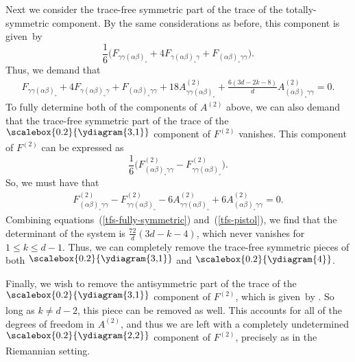 Next we consider the trace-free symmetric part of the trace of the totally-symmetric component. By the same considerations as before, this component is given~by
\[\frac{1}{6}\bigl(F_{\gamma \gamma (\alpha \beta)_\circ} + 4 F_{\gamma (\alpha \beta)_\circ \gamma} + F_{(\alpha \beta)_\circ \gamma \gamma}\bigr) .\]
Thus, we demand that
\begin{align} \label{tfs-fully-symmetric}
F_{\gamma \gamma (\alpha \beta)_\circ} + 4 F_{\gamma (\alpha \beta)_\circ \gamma} + F_{(\alpha \beta)_\circ \gamma \gamma} + 18 A^{(2)}_{\gamma \gamma (\alpha \beta)_\circ} + \frac{6(3d-2k-8)}{d} A^{(2)}_{(\alpha \beta)_\circ \gamma \gamma} = 0 .
\end{align}
To fully determine both of the components of $A^{(2)}$ above, we can also demand that the trace-free symmetric part of the trace of the $\raisebox{2.5pt}{\scalebox{0.2}{\ydiagram{3,1}}}$ component of $F^{(2)}$ vanishes. This component of $F^{(2)}$ can be expressed as
\[\frac{1}{6}\bigr(F^{(2)}_{(\alpha \beta)_\circ \gamma \gamma} - F^{(2)}_{\gamma \gamma (\alpha \beta)_\circ}\bigl) .\]
So, we must have that
\begin{align} \label{tfs-pistol}
F^{(2)}_{(\alpha \beta)_\circ \gamma \gamma} - F^{(2)}_{\gamma \gamma (\alpha \beta)_\circ} - 6 A^{(2)}_{\gamma \gamma (\alpha \beta)_\circ} + 6 A^{(2)}_{(\alpha \beta)_\circ \gamma \gamma} =0 .
\end{align}
Combining equations~(\ref{tfs-fully-symmetric}) and~(\ref{tfs-pistol}), we find that the determinant of the system is $\frac{72}{d} (3d-k-4)$, which never vanishes for $1 \leq k \leq d-1$. Thus, we can completely remove the trace-free symmetric pieces of both $\raisebox{2.5pt}{\scalebox{0.2}{\ydiagram{3,1}}}$ and $\raisebox{1.5pt}{\scalebox{0.2}{\ydiagram{4}}}$.

Finally, we wish to remove the antisymmetric part of the trace of the $\raisebox{2.5pt}{\scalebox{0.2}{\ydiagram{3,1}}}$ component of $F^{(2)}$, which is given~by . So long as $k \neq d-2$, this piece can be removed as well. This accounts for all of the degrees of freedom in $A^{(2)}$, and thus we are left with a completely undetermined $\raisebox{2.5pt}{\scalebox{0.2}{\ydiagram{2,2}}}$ component of $F^{(2)}$, precisely as in the Riemannian setting.



